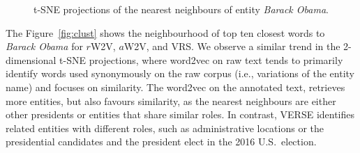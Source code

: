 \begin{figure}[t]
\centering
{}\hspace{12pt}%
\hspace{12pt}%
\caption{t-SNE projections of the nearest neighbours of entity \emph{Barack Obama}.
}
\label{fig:obama}
\end{figure}
The Figure~\ref{fig:clust} shows the neighbourhood of top ten closest words to \emph{Barack Obama} for $r$W2V, $a$W2V, and VRS. We observe a similar trend in the 2-dimensional t-SNE projections, where word2vec on raw text tends to primarily identify words used synonymously on the raw corpus (i.e., variations of the entity name) and focuses on similarity. The word2vec on the annotated text, retrieves more entities, but also favours similarity, as the nearest neighbours are either other presidents or entities that share similar roles. In contrast, VERSE identifies related entities with different roles, such as administrative locations or the presidential candidates and the president elect in the 2016 U.S.\ election.\\
